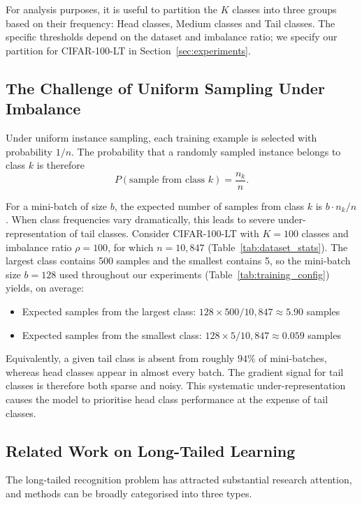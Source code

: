 \documentclass[12pt,a4paper]{article}
\begin{document}
For analysis purposes, it is useful to partition the $K$ classes into three groups based on their frequency: Head classes, Medium classes and Tail classes.
The specific thresholds depend on the dataset and imbalance ratio; we specify our partition for CIFAR-100-LT in Section~\ref{sec:experiments}.

\subsection{The Challenge of Uniform Sampling Under Imbalance}
\label{subsec:uniform_challenge}
Under uniform instance sampling, each training example is selected with probability $1/n$. The probability that a randomly sampled instance belongs to class $k$ is therefore
\begin{equation}
    P(\text{sample from class } k) = \frac{n_k}{n}.
    \label{eq:uniform_class_prob}
\end{equation}

For a mini-batch of size $b$, the expected number of samples from class $k$ is $b \cdot n_k / n$. When class frequencies vary dramatically, this leads to severe under-representation of tail classes. Consider CIFAR-100-LT with $K = 100$ classes and imbalance ratio $\rho = 100$, for which $n = 10{,}847$ (Table~\ref{tab:dataset_stats}). The largest class contains 500 samples and the smallest contains 5, so the mini-batch size $b = 128$ used throughout our experiments (Table~\ref{tab:training_config}) yields, on average:
\begin{itemize}[leftmargin=*]
    \item Expected samples from the largest class: $128 \times 500 / 10{,}847 \approx 5.90$ samples
    \item Expected samples from the smallest class: $128 \times 5 / 10{,}847 \approx 0.059$ samples
\end{itemize}

Equivalently, a given tail class is absent from roughly $94\%$ of mini-batches, whereas head classes appear in almost every batch. The gradient signal for tail classes is therefore both sparse and noisy. This systematic under-representation causes the model to prioritise head class performance at the expense of tail classes.

\subsection{Related Work on Long-Tailed Learning}
\label{subsec:related_work}
The long-tailed recognition problem has attracted substantial research attention, and methods can be broadly categorised into three types.
\end{document}
